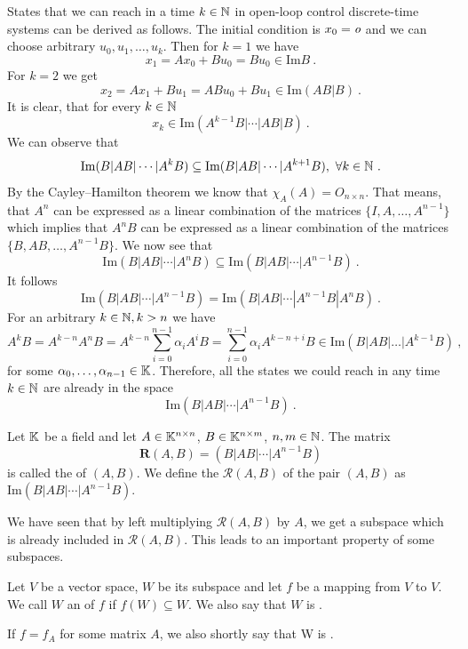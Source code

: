 \sloppy
States that we can reach in a time $k\in\mathbb{N}$ in open-loop control discrete-time systems can be derived as follows. The initial condition is $x_0=\textit{o}$ and we can choose arbitrary $u_0,u_1,\ldots,u_k$. Then for $k=1$ we have 
$$x_1=Ax_0+Bu_0=Bu_0 \in \text{Im}B\ .$$
For $k=2$ we get
$$x_2=Ax_1+Bu_1=ABu_0+Bu_1\in\text{Im}(AB|B)\ .$$
It is clear, that for every $k\in\mathbb{N}$
$$x_k\in\text{Im}(A^{k-1}B|\cdots|AB|B)\ .$$
We can observe that
$$\text{Im}(B|AB|\cdots|A^kB) \subseteq \text{Im}(B|AB|\cdots|A^{k+1}B),\ \forall k\in\mathbb{N}\ .$$
By the Cayley–Hamilton theorem we know that $\chi_A(A)=O_{n\times n}$. That means, that $A^n$ can be expressed as a linear combination of the matrices $\{I,A,\ldots,A^{n-1}\}$ which implies that $A^nB$ can be expressed as a linear combination of the matrices $\{B,AB,\ldots,A^{n-1}B\}$. We now see that $$\text{Im}(B|AB|\cdots|A^{n}B) \subseteq \text{Im}(B|AB|\cdots|A^{n-1}B)\ .$$
It follows
\begin{equation}
\label{eq:cayleHamilReachable}
	\text{Im}(B|AB|\cdots|A^{n-1}B)=\text{Im}(B|AB|\cdots|A^{n-1}B|A^nB)\ .
\end{equation}
For an arbitrary $k\in\mathbb{N},k>n$ we have $$A^kB=A^{k-n}A^nB=A^{k-n}\sum^{n-1}_{i=0}\alpha_i A^iB=\sum^{n-1}_{i=0}\alpha_i A^{k-n+i}B\in\text{Im}(B|AB|\ldots|A^{k-1}B)\ ,$$
for some $\alpha_0,\ldots,\alpha_{n-1}\in\mathbb{K}$.
Therefore, all the states we could reach in any time $k\in\mathbb{N}$ are already in the space 
$$\text{Im}(B|AB|\cdots|A^{n-1}B)\ .$$
\begin{definition}
	Let $\mathbb{K}$ be a field and let $A \in \mathbb{K}^{n \times n}$, $B \in \mathbb{K}^{n \times m}$, $n,m \in \mathbb{N}$. The matrix $$\mathbf{R}(A,B)=(B|AB|\cdots|A^{n-1}B)$$ is called the  of $(A,B)$. We define the  $\mathcal{R}(A,B)$ of the pair $(A,B)$ as $\text{Im}(B|AB|\cdots|A^{n-1}B)$. 
\end{definition}

We have seen that by left multiplying $\mathcal{R}(A,B)$ by $A$, we get a subspace which is already included in $\mathcal{R}(A,B)$. This leads to an important property of some subspaces.

\begin{definition}
	Let $V$ be a vector space, $W$ be its subspace and let $f$ be a mapping from $V$ to $V$. We call $W$ an  of $f$ if $f(W)\subseteq W$. We also say that $W$ is . 
	
	If $f=f_A$ for some matrix $A$, we also shortly say that W is .
\end{definition}

